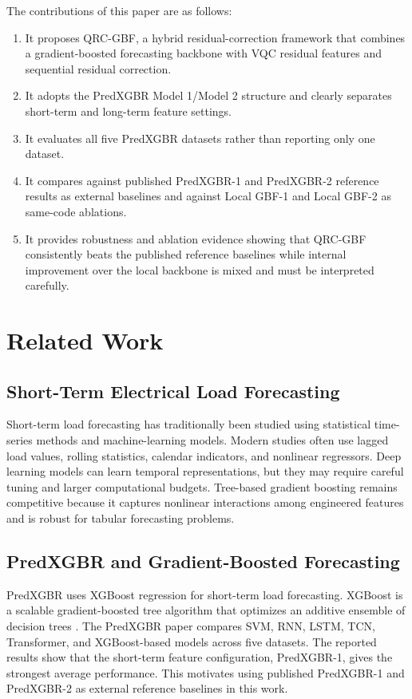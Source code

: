 \documentclass[11pt]{article}
\begin{document}
The contributions of this paper are as follows:
\begin{enumerate}
    \item It proposes QRC-GBF, a hybrid residual-correction framework that combines a gradient-boosted forecasting backbone with VQC residual features and sequential residual correction.
    \item It adopts the PredXGBR Model 1/Model 2 structure and clearly separates short-term and long-term feature settings.
    \item It evaluates all five PredXGBR datasets rather than reporting only one dataset.
    \item It compares against published PredXGBR-1 and PredXGBR-2 reference results as external baselines and against Local GBF-1 and Local GBF-2 as same-code ablations.
    \item It provides robustness and ablation evidence showing that QRC-GBF consistently beats the published reference baselines while internal improvement over the local backbone is mixed and must be interpreted carefully.
\end{enumerate}

\section{Related Work}
\subsection{Short-Term Electrical Load Forecasting}
Short-term load forecasting has traditionally been studied using statistical time-series methods and machine-learning models. Modern studies often use lagged load values, rolling statistics, calendar indicators, and nonlinear regressors. Deep learning models can learn temporal representations, but they may require careful tuning and larger computational budgets. Tree-based gradient boosting remains competitive because it captures nonlinear interactions among engineered features and is robust for tabular forecasting problems.

\subsection{PredXGBR and Gradient-Boosted Forecasting}
PredXGBR uses XGBoost regression for short-term load forecasting. XGBoost is a scalable gradient-boosted tree algorithm that optimizes an additive ensemble of decision trees \cite{chen2016xgboost}. The PredXGBR paper compares SVM, RNN, LSTM, TCN, Transformer, and XGBoost-based models across five datasets. The reported results show that the short-term feature configuration, PredXGBR-1, gives the strongest average performance. This motivates using published PredXGBR-1 and PredXGBR-2 as external reference baselines in this work.
\end{document}
